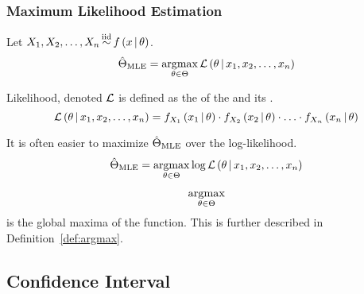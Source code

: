 		\subsubsection{Maximum Likelihood Estimation} \label{subsubsec:Maximum Likelihood Estimation}
			\begin{definition} \label{def:Maximum Likelihood Estimation}
				Let $ X_{1},X_{2},\ldots,X_{n} \operatorname{\overset{\text{iid}}{\operatorname{\sim}}} f \left( x \operatorname{\vert} \theta \right) $.
				\begin{equation} \label{eq:Maximum Likelihood Estimation}
					\hat{\Theta}_{\operatorname{\text{MLE}}} = \operatorname*{argmax}_{\theta \in \Theta} \operatorname{\mathcal{L}} \left( \theta \operatorname{\vert} x_{1},x_{2},\ldots,x_{n} \right)
				\end{equation}
				\begin{remark} \label{rmk:Likelihood}
					Likelihood, denoted $\operatorname{\mathcal{L}}$ is defined as the  of the  and its .
					\begin{equation} \label{eq:Likelihood}
						\operatorname{\mathcal{L}} \left( \theta \operatorname{\vert} x_{1},x_{2},\ldots,x_{n} \right) = f_{X_{1}} \left( x_{1} \operatorname{\vert} \theta \right) \cdot f_{X_{2}} \left( x_{2} \operatorname{\vert} \theta \right) \cdot \ldots \cdot f_{X_{n}} \left( x_{n} \operatorname{\vert} \theta \right)
					\end{equation}
				\end{remark}
				\begin{remark}
					It is often easier to maximize $\hat{\Theta}_{\operatorname{\text{MLE}}}$ over the log-likelihood.
					\begin{equation*}
						\hat{\Theta}_{\operatorname{\text{MLE}}} = \operatorname*{argmax}_{\theta \in \Theta} \log \operatorname{\mathcal{L}} \left( \theta \operatorname{\vert} x_{1},x_{2},\ldots,x_{n} \right)
					\end{equation*}
				\end{remark}
				\begin{remark}
					\[ \operatorname*{argmax}_{\theta \in \Theta} \] is the global maxima of the function. This is further described in Definition~\ref{def:argmax}.
				\end{remark}
			\end{definition}
	
	\subsection{Confidence Interval} \label{subsec:Confidence Interval}
		